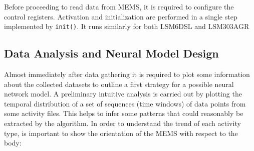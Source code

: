 Before proceeding to read data from MEMS, it is required to configure the control registers. Activation and initialization are performed in a single step implemented by \texttt{init()}. It runs similarly for both LSM6DSL and LSM303AGR



\newpage
\subsection{Data Analysis and Neural Model Design}
Almost immediately after data gathering it is required to plot some information about the collected datasets to outline a first strategy for a possible neural network model. A preliminary intuitive analysis is carried out by plotting the temporal distribution of a set of sequences (time windows) of data points from some activity files. This helps to infer some patterns that could reasonably be extracted by the algorithm.\newline
In order to understand the trend of each activity type, is important to show the orientation of the MEMS with respect to the body:
